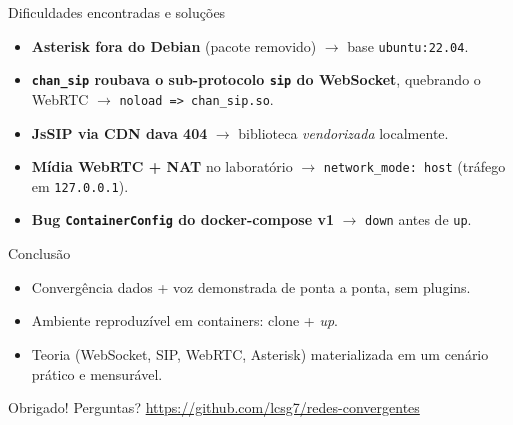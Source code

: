 \documentclass[aspectratio=169]{beamer}
\begin{document}
\begin{frame}[fragile]{Dificuldades encontradas e soluções}
  \begin{itemize}
    \item \textbf{Asterisk fora do Debian} (pacote removido) $\rightarrow$ base
      \verb|ubuntu:22.04|.
    \item \textbf{\texttt{chan\_sip} roubava o sub-protocolo \texttt{sip} do WebSocket},
      quebrando o WebRTC $\rightarrow$ \verb|noload => chan_sip.so|.
    \item \textbf{JsSIP via CDN dava 404} $\rightarrow$ biblioteca \emph{vendorizada}
      localmente.
    \item \textbf{Mídia WebRTC + NAT} no laboratório $\rightarrow$
      \verb|network_mode: host| (tráfego em \verb|127.0.0.1|).
    \item \textbf{Bug \texttt{ContainerConfig} do docker-compose v1} $\rightarrow$
      \verb|down| antes de \verb|up|.
  \end{itemize}
\end{frame}

\begin{frame}{Conclusão}
  \begin{itemize}
    \item Convergência \alert{dados + voz} demonstrada de ponta a ponta, sem plugins.
    \item Ambiente \alert{reproduzível} em containers: clone + \emph{up}.
    \item Teoria (WebSocket, SIP, WebRTC, Asterisk) materializada em um cenário
      prático e \alert{mensurável}.
  \end{itemize}
\end{frame}

\begin{frame}{Obrigado!}
  \centering
  \Large Perguntas?
  \vfill
  \normalsize \url{https://github.com/lcsg7/redes-convergentes}
\end{frame}
\end{document}
